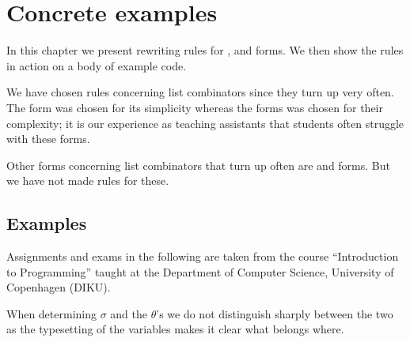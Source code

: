 \chapter{Concrete examples}
\label{chap:concrete-examples}
In this chapter we present rewriting rules for ,  and
 forms. We then show the rules in action on a body of example code.

We have chosen rules concerning list combinators since they turn up very
often. The  form was chosen for its simplicity whereas the
 forms was chosen for their complexity; it is our
experience as teaching assistants that students often struggle with these forms.

Other forms concerning list combinators that turn up often are  and
 forms. But we have not made rules for these.



\section{Examples}
Assignments and exams in the following are taken from the course ``Introduction
to Programming'' taught at the Department of Computer Science, University of
Copenhagen (DIKU).

When determining $\sigma$ and the $\theta$'s we do not distinguish sharply
between the two as the typesetting of the variables makes it clear what belongs
where.






